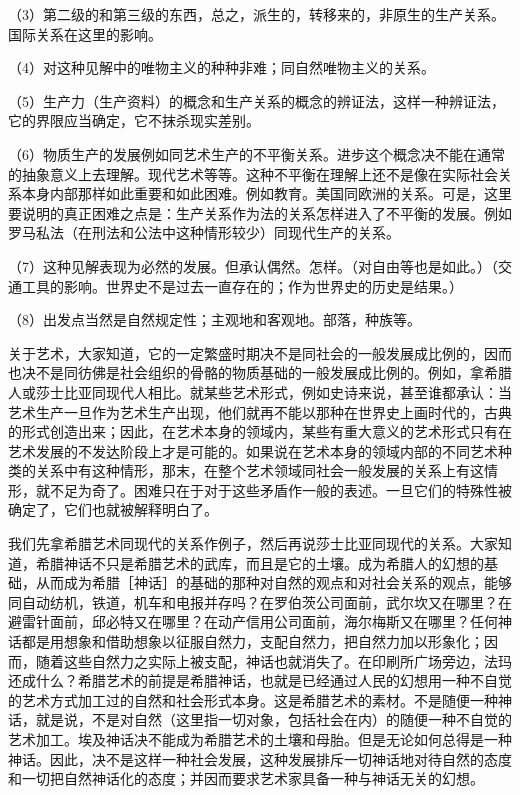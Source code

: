\documentclass[a4paper,twoside,12pt,AutoFakeBold]{ctexart}
\begin{document}
（3）第二级的和第三级的东西，总之，派生的，转移来的，非原生的生产关系。国际关系在这里的影响。

（4）对这种见解中的唯物主义的种种非难；同自然唯物主义的关系。

（5）生产力（生产资料）的概念和生产关系的概念的辨证法，这样一种辨证法，它的界限应当确定，它不抹杀现实差别。

（6）物质生产的发展例如同艺术生产的不平衡关系。进步这个概念决不能在通常的抽象意义上去理解。现代艺术等等。这种不平衡在理解上还不是像在实际社会关系本身内部那样如此重要和如此困难。例如教育。美国同欧洲的关系。可是，这里要说明的真正困难之点是：生产关系作为法的关系怎样进入了不平衡的发展。例如罗马私法（在刑法和公法中这种情形较少）同现代生产的关系。

（7）这种见解表现为必然的发展。但承认偶然。怎样。（对自由等也是如此。）（交通工具的影响。世界史不是过去一直存在的；作为世界史的历史是结果。）

（8）出发点当然是自然规定性；主观地和客观地。部落，种族等。

关于艺术，大家知道，它的一定繁盛时期决不是同社会的一般发展成比例的，因而也决不是同彷佛是社会组织的骨骼的物质基础的一般发展成比例的。例如，拿希腊人或莎士比亚同现代人相比。就某些艺术形式，例如史诗来说，甚至谁都承认：当艺术生产一旦作为艺术生产出现，他们就再不能以那种在世界史上画时代的，古典的形式创造出来；因此，在艺术本身的领域内，某些有重大意义的艺术形式只有在艺术发展的不发达阶段上才是可能的。如果说在艺术本身的领域内部的不同艺术种类的关系中有这种情形，那末，在整个艺术领域同社会一般发展的关系上有这情形，就不足为奇了。困难只在于对于这些矛盾作一般的表述。一旦它们的特殊性被确定了，它们也就被解释明白了。

我们先拿希腊艺术同现代的关系作例子，然后再说莎士比亚同现代的关系。大家知道，希腊神话不只是希腊艺术的武库，而且是它的土壤。成为希腊人的幻想的基础，从而成为希腊［神话］的基础的那种对自然的观点和对社会关系的观点，能够同自动纺机，铁道，机车和电报并存吗？在罗伯茨公司面前，武尔坎又在哪里？在避雷针面前，邱必特又在哪里？在动产信用公司面前，海尔梅斯又在哪里？任何神话都是用想象和借助想象以征服自然力，支配自然力，把自然力加以形象化；因而，随着这些自然力之实际上被支配，神话也就消失了。在印刷所广场旁边，法玛还成什么？希腊艺术的前提是希腊神话，也就是已经通过人民的幻想用一种不自觉的艺术方式加工过的自然和社会形式本身。这是希腊艺术的素材。不是随便一种神话，就是说，不是对自然（这里指一切对象，包括社会在内）的随便一种不自觉的艺术加工。埃及神话决不能成为希腊艺术的土壤和母胎。但是无论如何总得是一种神话。因此，决不是这样一种社会发展，这种发展排斥一切神话地对待自然的态度和一切把自然神话化的态度；并因而要求艺术家具备一种与神话无关的幻想。
\end{document}
